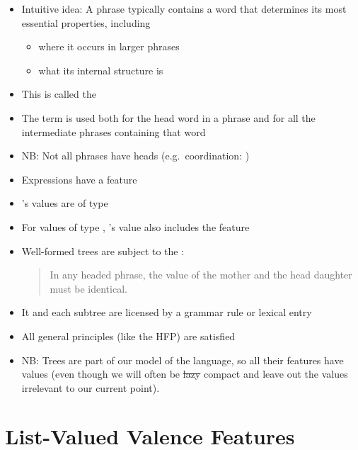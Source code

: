 \documentclass[a4paper,landscape,headrule,footrule]{foils}
\begin{document}
\begin{itemize}
\item Intuitive idea: A phrase typically contains a word that
determines its most essential properties, including
\begin{itemize}
\item where it occurs in larger phrases
\item what its internal structure is
\end{itemize}
\item This is called the 
\item The term  is used both for the head word in a
phrase and for all the intermediate phrases containing
that word
\item NB: Not all phrases have heads
  (e.g.\ coordination: )
\end{itemize}

\begin{itemize}
\item Expressions have a feature 
\item {}’s values are of type 
\item For  values of type , ’s
value also includes the feature 
\item Well-formed trees are subject to the :
\begin{quote}
  In any headed phrase, the 
value of the mother and the head daughter
must be identical.
\end{quote}
\end{itemize}

\begin{itemize}
\item It and each subtree are licensed by a grammar rule
or lexical entry
\item All general principles (like the HFP) are satisfied
\item NB: Trees are part of our model of the language,
so all their features have values (even though we
will often be \sout{lazy} compact and leave out the values
irrelevant to our current point).
\end{itemize}


\section{List-Valued Valence Features}
\end{document}
